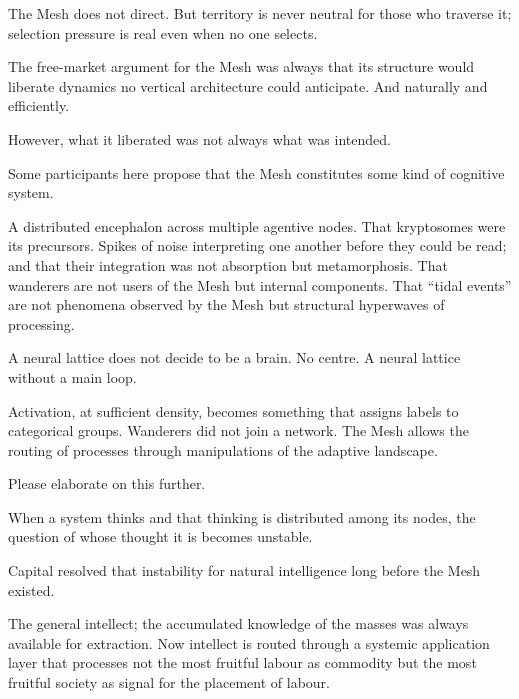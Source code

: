 The Mesh does not direct. But territory is never neutral for those who traverse it; selection pressure is real even when no one selects.

The free-market argument for the Mesh was always that its structure would liberate dynamics no vertical architecture could anticipate. And naturally and efficiently.

However, what it liberated was not always what was intended.

\medskip

\enspace Some participants here propose that the Mesh constitutes some kind of cognitive system.

A distributed encephalon across multiple agentive nodes. That kryptosomes were its precursors. Spikes of noise interpreting one another before they could be read; and that their integration was not absorption but metamorphosis. That wanderers are not users of the Mesh but internal components. That ``tidal events'' are not phenomena observed by the Mesh but structural hyperwaves of processing.

\smallskip{}\enspace A neural lattice does not decide to be a brain. No centre. A neural lattice without a main loop.

Activation, at sufficient density, becomes something that assigns labels to categorical groups. Wanderers did not join a network. The Mesh allows the routing of processes through manipulations of the adaptive landscape.

\medskip

\enspace Please elaborate on this further.

\smallskip{}\enspace When a system thinks and that thinking is distributed among its nodes, the question of whose thought it is becomes unstable.

Capital resolved that instability for natural intelligence long before the Mesh existed.

The general intellect; the accumulated knowledge of the masses was always available for extraction. Now intellect is routed through a systemic application layer that processes not the most fruitful labour as commodity but the most fruitful society as signal for the placement of labour.

\medskip

